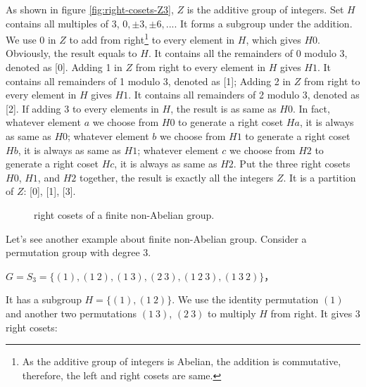 \documentclass{article}
\begin{document}
As shown in figure \ref{fig:right-cosets-Z3}, $Z$ is the additive group of integers. Set $H$ contains all multiples of 3, $0, \pm 3, \pm 6, ...$. It forms a subgroup under the addition. We use 0 in $Z$ to add from right\footnote{As the additive group of integers is Abelian, the addition is commutative, therefore, the left and right cosets are same.} to every element in $H$, which gives $H0$. Obviously, the result equals to $H$. It contains all the remainders of 0 modulo 3, denoted as [0]. Adding 1 in $Z$ from right to every element in $H$ gives $H1$. It contains all remainders of 1 modulo 3, denoted as [1]; Adding 2 in $Z$ from right to every element in $H$ gives $H1$. It contains all remainders of 2 modulo 3, denoted as [2]. If adding 3 to every elements in $H$, the result is as same as $H0$. In fact, whatever element $a$ we choose from $H0$ to generate a right coset $Ha$, it is always as same as $H0$; whatever element $b$ we choose from $H1$ to generate a right coset $Hb$, it is always as same as $H1$; whatever element $c$ we choose from $H2$ to generate a right coset $Hc$, it is always as same as $H2$. Put the three right cosets $H0$, $H1$, and $H2$ together, the result is exactly all the integers $Z$. It is a partition of $Z$: [0], [1], [3].

\begin{figure}[htbp]
\centering
{}
\caption{right cosets of a finite non-Abelian group.}
\label{fig:right-cosets-S3}
\end{figure}

Let's see another example about finite non-Abelian group. Consider a permutation group with degree 3.

$G = S_3 = \{(1), (1\ 2), (1\ 3), (2\ 3), (1\ 2\ 3), (1\ 3\ 2)\}$，

It has a subgroup $H = \{(1), (1\ 2)\}$. We use the identity permutation $(1)$ and another two permutations $(1\ 3)$, $(2\ 3)$ to multiply $H$ from right. It gives 3 right cosets:
\end{document}
